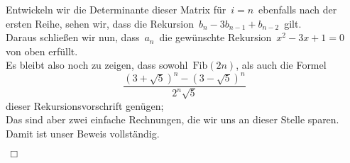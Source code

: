 Entwickeln wir die Determinante dieser Matrix für $\,i=n\,$ ebenfalls nach der ersten Reihe, sehen wir, dass die Rekursion $\,b_n-3b_{n-1} + b_{n-2}\,$ gilt.\\
Daraus schließen wir nun, dass $\,a_n\,$ die gewünschte Rekursion $\,x^2-3x+1=0\,$ von oben erfüllt.\\
Es bleibt also noch zu zeigen, dass sowohl $\,\mathrm{Fib}(2n)$,\; als auch die Formel
\begin{equation*}
 \,\frac{(3+\sqrt{5})^{n}-(3-\sqrt{5})^{n}}{2^{n}\sqrt{5}}\,
\end{equation*}
dieser Rekursionsvorschrift genügen;\\ 
Das sind aber zwei einfache Rechnungen, die wir uns an dieser Stelle sparen.\\
Damit ist unser Beweis vollständig.
\begin{flushright} $\,\Box\,$ \end{flushright}
